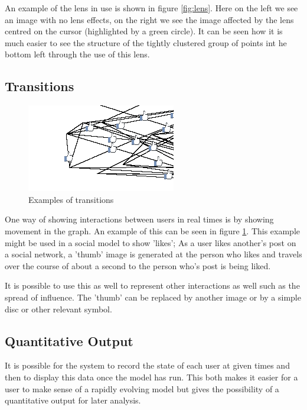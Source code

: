 \documentclass[12pt,a4paper]{article}
\begin{document}
An example of the lens in use is shown in figure \ref{fig:lens}. Here on the left we see an image with no lens effects, on the right we see the image affected by the lens centred on the cursor (highlighted by a green circle). It can be seen how it is much easier to see the structure of the tightly clustered group of points int he bottom left through the use of this lens.

\subsection{Transitions}

\begin{figure}[htb]
\caption{Examples of transitions}
\label{fig:transitions}
\centering
\includegraphics[scale=0.7]{Transitions.png}
\end{figure}

\noindent
One way of showing interactions between users in real times is by showing movement in the graph. An example of this can be seen in figure \ref{fig:transitions}. This example might be used in a social model to show 'likes'; As a user likes another's post on a social network, a 'thumb' image is generated at the person who likes and travels over the course of about a second to the person who's post is being liked.

It is possible to use this as well to represent other interactions as well such as the spread of influence. The 'thumb' can be replaced by another image or by a simple disc or other relevant symbol.

\subsection{Quantitative Output}
\noindent
It is possible for the system to record the state of each user at given times and then to display this data once the model has run. This both makes it easier for a user to make sense of a rapidly evolving model but gives the possibility of a quantitative output for later analysis.
\end{document}

